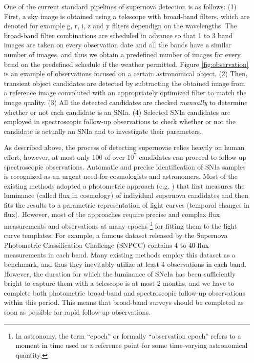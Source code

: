 \documentclass[conference,compsoc]{IEEEtran}
\begin{document}
  One of the current standard pipelines of supernova detection is as follows:
  (1) First, a sky image is obtained using a telescope with broad-band filters, which are denoted for example g, r, i, z and y filters dependign on the wavelengths.
  The broad-band filter combinations are scheduled in advance so that 1 to 3 band images are taken on every observation date and all the bands have a similar number of images, and thus we obtain a predefined number of images for every band on the predefined schedule if the weather permitted.
  Figure \ref{fig:observation} is an example of observations focused on a certain astronomical object. %
  (2) Then, transient object candidates are detected by subtracting the obtained image from a reference image convoluted with an appropriately optimized filter to match the image quality. %
  (3) All the detected candidates are checked \emph{manually} to determine whether or not each candidate is an SNIa.
  (4) Selected SNIa candidates are employed in spectroscopic follow-up observations to check whether or not the candidate is actually an SNIa and to investigate their parameters.%

  As described above, the process of detecting supernovae relies heavily on human effort, however, at most only 100 of over $10^7$ candidates can proceed to follow-up spectroscopic observations.
  Automatic and precise identification of SNIa samples is recognized as an urgent need for cosmologists and astronomers.
  Most of the existing methods adopted a photometric approach (e.g. \cite{Sullivan2006}) that first measures the luminance (called flux in cosmology) of individual supernova candidates and then fits the results to a parametric representation of light curves (temporal changes in flux).
  However, most of the approaches require precise and complex flux measurements and observations at many epochs
  \footnote{In astronomy, the term ``epoch'' or formally ``observation epoch'' refers to a moment in time used as a reference point for some time-varying astronomical quantity.}
  for fitting them to the light curve templates.
  For example, a famous dataset released by the Supernova Photometric Classification Challenge (SNPCC) \cite{Kessler2010a} contains 4 to 40 flux measurements in each band.  Many existing methods employ this dataset as a benchmark, and thus they inevitably utilize at least 4 observations in each band.
  However, the duration for which the luminance of SNeIa has been sufficiently bright to capture them with a telescope is at most 2 months, and we have to complete both photometric broad-band and spectroscopic follow-up observations within this period.
  This means that broad-band surveys should be completed as soon as possible for rapid follow-up observations.
\end{document}
